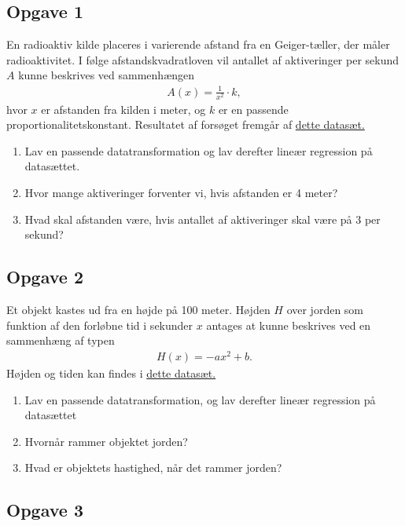 
\subsection*{Opgave 1}

En radioaktiv kilde placeres i varierende afstand fra en Geiger-tæller, der måler radioaktivitet. I følge afstandskvadratloven vil antallet af aktiveringer per sekund $A$ kunne beskrives ved sammenhængen
\begin{align*}
	A(x) = \frac{1}{x^2}\cdot k,
\end{align*}
hvor $x$ er afstanden fra kilden i meter, og $k$ er en passende proportionalitetskonstant. Resultatet af forsøget fremgår af \href{https://github.com/ChristianJLex/TeachingNotes/raw/master/2023-2024/Data og lign/GeigerAktiveringer.xlsx}{\color{blue!60} dette datasæt.}

\begin{enumerate}[label=\roman*)]
	\item Lav en passende datatransformation og lav derefter lineær regression på datasættet.
	\item Hvor mange aktiveringer forventer vi, hvis afstanden er 4 meter?
	\item Hvad skal afstanden være, hvis antallet af aktiveringer skal være på 3 per sekund?
\end{enumerate}

\subsection*{Opgave 2}

Et objekt kastes ud fra en højde på 100 meter. Højden $H$ over jorden som funktion af den forløbne tid i sekunder $x$ antages at kunne beskrives ved en sammenhæng af typen
\begin{align*}
	H(x) = -ax^2 + b.
\end{align*}
Højden og tiden kan findes i \href{https://github.com/ChristianJLex/TeachingNotes/raw/master/2023-2024/Data og lign/Fritfald.xlsx}{\color{blue!60} dette datasæt.}
\begin{enumerate}[label=\roman*)]
	\item Lav en passende datatransformation, og lav derefter lineær regression på datasættet
	\item Hvornår rammer objektet jorden?
	\item Hvad er objektets hastighed, når det rammer jorden?
\end{enumerate}


\subsection*{Opgave 3}

